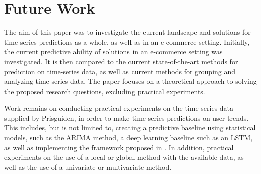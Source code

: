 
\section{Future Work}
\label{sections:Discussion:FutureWork}



% 

The aim of this paper was to investigate the current landscape and solutions for time-series predictions as a whole,
as well as in an e-commerce setting.
Initially, the current predictive ability of solutions in an e-commerce setting was investigated.
It is then compared to the current state-of-the-art methods for prediction on time-series data,
as well as current methods for grouping and analyzing time-series data.
The paper focuses on a theoretical approach to solving the proposed research questions,
excluding practical experiments.

Work remains on conducting practical experiments on the time-series data supplied by Prisguiden,
in order to make time-series predictions on user trends.
This includes, but is not limited to, creating a predictive baseline using statistical models, such as the ARIMA method, a deep learning baseline such as an LSTM,
as well as implementing the framework proposed in .
In addition, practical experiments on the use of a local or global method with the available data,
as well as the use of a univariate or multivariate method.

